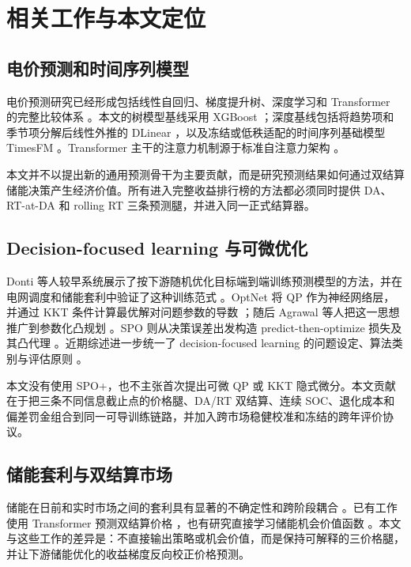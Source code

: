 \documentclass[UTF8,a4paper,11pt,fontset=fandol]{ctexart}
\begin{document}
\section{相关工作与本文定位}

\subsection{电价预测和时间序列模型}

电价预测研究已经形成包括线性自回归、梯度提升树、深度学习和 Transformer 的完整比较体系
\cite{weron2014,lago2021}。本文的树模型基线采用 XGBoost
\cite{chen2016}；深度基线包括将趋势项和季节项分解后线性外推的 DLinear
\cite{zeng2023}，以及冻结或低秩适配的时间序列基础模型 TimesFM
\cite{das2024}。Transformer 主干的注意力机制源于标准自注意力架构
\cite{vaswani2017}。

本文并不以提出新的通用预测骨干为主要贡献，而是研究预测结果如何通过双结算储能决策产生经济价值。所有进入完整收益排行榜的方法都必须同时提供 DA、RT-at-DA 和 rolling RT 三条预测腿，并进入同一正式结算器。

\subsection{Decision-focused learning 与可微优化}

Donti 等人较早系统展示了按下游随机优化目标端到端训练预测模型的方法，并在电网调度和储能套利中验证了这种训练范式
\cite{donti2017}。OptNet 将 QP 作为神经网络层，并通过 KKT 条件计算最优解对问题参数的导数
\cite{amos2017}；随后 Agrawal 等人把这一思想推广到参数化凸规划
\cite{agrawal2019}。SPO 则从决策误差出发构造 predict-then-optimize 损失及其凸代理
\cite{elmachtoub2022}。近期综述进一步统一了 decision-focused learning 的问题设定、算法类别与评估原则
\cite{mandi2024}。

本文没有使用 SPO+，也不主张首次提出可微 QP 或 KKT 隐式微分。本文贡献在于把三条不同信息截止点的价格腿、DA/RT 双结算、连续 SOC、退化成本和偏差罚金组合到同一可导训练链路，并加入跨市场稳健校准和冻结的跨年评价协议。

\subsection{储能套利与双结算市场}

储能在日前和实时市场之间的套利具有显著的不确定性和跨阶段耦合
\cite{krishnamurthy2018}。已有工作使用 Transformer 预测双结算价格
\cite{alghumayjan2024}，也有研究直接学习储能机会价值函数
\cite{liu2023}。本文与这些工作的差异是：不直接输出策略或机会价值，而是保持可解释的三价格腿，并让下游储能优化的收益梯度反向校正价格预测。
\end{document}
